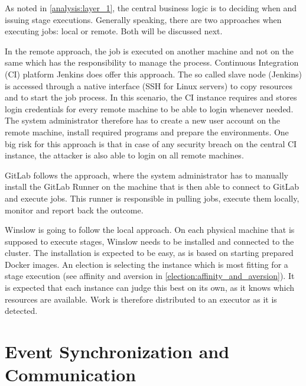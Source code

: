 As noted in \autoref{analysis:layer_1}, the central business logic is to deciding when and issuing stage executions.
Generally speaking, there are two approaches when executing jobs: local or remote. Both will be discussed next.

In the remote approach, the job is executed on another machine and not on the same which has the responsibility to manage the process.
Continuous Integration (CI) platform Jenkins\cite{jenkins:main} does offer this approach.
The so called slave node (Jenkins) is accessed through a native interface (SSH for Linux servers) to copy resources and to start the job process.
In this scenario, the CI instance requires and stores login credentials for every remote machine to be able to login whenever needed.
The system administrator therefore has to create a new user account on the remote machine, install required programs and prepare the environments.
One big risk for this approach is that in case of any security breach on the central CI instance, the attacker is also able to login on all remote machines.

GitLab\cite{gitlab:main} follows the approach, where the system administrator has to manually install the GitLab Runner on the machine that is then able to connect to GitLab and execute jobs.
This runner is responsible in pulling jobs, execute them locally, monitor and report back the outcome.

Winslow is going to follow the local approach.
On each physical machine that is supposed to execute stages, Winslow needs to be installed and connected to the cluster.
The installation is expected to be easy, as is based on starting prepared Docker images.
An election is selecting the instance which is most fitting for a stage execution (see affinity and aversion in \autoref{election:affinity_and_aversion}).
It is expected that each instance can judge this best on its own, as it knows which resources are available.
Work is therefore distributed to an executor as it is detected.



\section{Event Synchronization and Communication}

